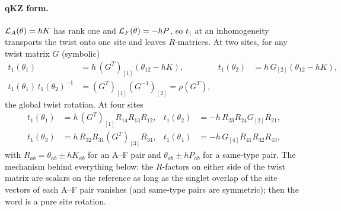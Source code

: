 \paragraph{qKZ form.} $\mathcal L_A(\theta)=hK$ has rank one and $\mathcal L_F(\theta)=-hP$, so $t_1$ at an inhomogeneity transports the twist
onto one site and leaves $R$-matrices. At two sites, for any twist matrix $G$ (symbolic) \ex
\begin{align}
 t_1(\theta_1)&=h\,(G^T)_{[1]}(\theta_{12}-hK), & t_1(\theta_2)&=h\,G_{[2]}(\theta_{12}-hK),\nonumber\\
 t_1(\theta_1)\,t_1(\theta_2)^{-1}&=(G^T)_{[1]}(G^{-1})_{[2]}=\rho(G^T),
\end{align}
the global twist rotation. At four sites \ex
\begin{align}
 t_1(\theta_1)&=h\,(G^T)_{[1]}R_{14}R_{13}R_{12}, & t_1(\theta_2)&=-h\,R_{23}R_{24}G_{[2]}R_{21},\nonumber\\
 t_1(\theta_3)&=h\,R_{32}R_{31}(G^T)_{[3]}R_{34}, & t_1(\theta_4)&=-h\,G_{[4]}R_{41}R_{42}R_{43},
\end{align}
with $R_{ab}=\theta_{ab}\pm hK_{ab}$ for an A--F pair and $\theta_{ab}\pm hP_{ab}$ for a same-type pair. The mechanism behind
everything below: the $R$-factors on either side of the twist matrix are scalars on the reference as long as the singlet overlap of
the site vectors of each A--F pair vanishes (and same-type pairs are symmetric); then the word is a pure site rotation.

